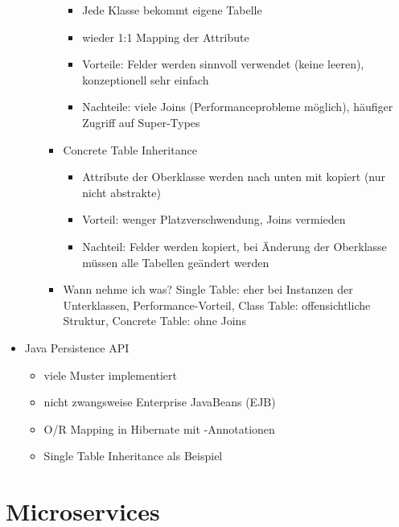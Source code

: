 \documentclass[paper=a4, fontsize=11pt]{scrartcl} %
\numberwithin{equation}{section} %
\numberwithin{figure}{section} %
\numberwithin{table}{section} %
\begin{document}
\begin{itemize}
\begin{itemize}
\begin{itemize}
\begin{itemize}
        \item Jede Klasse bekommt eigene Tabelle
        \item wieder 1:1 Mapping der Attribute
        \item Vorteile: Felder werden sinnvoll verwendet (keine leeren), konzeptionell sehr einfach
        \item Nachteile: viele Joins (Performanceprobleme möglich), häufiger Zugriff auf Super-Types
      \end{itemize}
      \item Concrete Table Inheritance
      \begin{itemize}
        \item Attribute der Oberklasse werden nach unten mit kopiert (nur nicht abstrakte)
        \item Vorteil: wenger Platzverschwendung, Joins vermieden
        \item Nachteil: Felder werden kopiert, bei Änderung der Oberklasse müssen alle Tabellen geändert werden
      \end{itemize}
      \item Wann nehme ich was? Single Table: eher bei Instanzen der Unterklassen, Performance-Vorteil, Class Table: offensichtliche Struktur, Concrete Table: ohne Joins
    \end{itemize}
  \end{itemize}
  \item Java Persistence API
  \begin{itemize}
    \item viele Muster implementiert
    \item nicht zwangsweise Enterprise JavaBeans (EJB)
    \item O/R Mapping in Hibernate mit \@-Annotationen
    \item Single Table Inheritance als Beispiel
  \end{itemize}
\end{itemize}

\section{Microservices}
\end{document}
